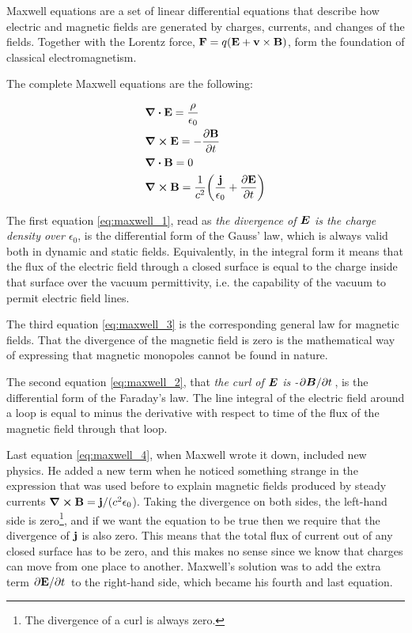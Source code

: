 \documentclass[11pt,a4paper]{article}
\begin{document}
Maxwell equations \cite{feynman} are a set of linear differential equations that describe how electric and magnetic fields are generated by charges, currents, and changes of the fields. Together with the Lorentz force, $\vb{F}=q(\vb{E}+\vb{v}\times\vb{B})$, form the foundation of classical electromagnetism.

The complete Maxwell equations are the following:

\begin{subequations}\label{eq:maxwell_equations}
\begin{align}
&\div\vb{E}=\frac{\rho}{\epsilon_0}\label{eq:maxwell_1}\\
&\curl\vb{E}=-\pdv{\vb{B}}{t}\label{eq:maxwell_2}\\
&\div\vb{B}=0\label{eq:maxwell_3}\\
&\curl\vb{B}=\frac{1}{c^2}\qty(\frac{\vb{j}}{\epsilon_0}+\pdv{\vb{E}}{t})\label{eq:maxwell_4}
\end{align}
\end{subequations}

The first equation \eqref{eq:maxwell_1}, read as \emph{the divergence of $\vb*{E}$ is the charge density over $\epsilon_0$}, is the differential form of the Gauss' law, which is always valid both in dynamic and static fields. Equivalently, in the integral form it means that the flux of the electric field through a closed surface is equal to the charge inside that surface over the vacuum permittivity, i.e. the capability of the vacuum to permit electric field lines.

The third equation \eqref{eq:maxwell_3} is the corresponding general law for magnetic fields. That the divergence of the magnetic field is zero is the mathematical way of expressing that magnetic monopoles cannot be found in nature.

The second equation \eqref{eq:maxwell_2}, that \emph{the curl of $\vb*{E}$ is -$\pdv*{\vb*{B}}{t}$}, is the differential form of the Faraday's law. The line integral of the electric field around a loop is equal to minus the derivative with respect to time of the flux of the magnetic field through that loop.

Last equation \eqref{eq:maxwell_4}, when Maxwell wrote it down, included new physics. He added a new term when he noticed something strange in the expression that was used before to explain magnetic fields produced by steady currents $\curl\vb{B}=\vb{j}/(c^2\epsilon_0$). Taking the divergence on both sides, the left-hand side is zero\footnote{The divergence of a curl is always zero.}, and if we want the equation to be true then we require that the divergence of $\vb{j}$ is also zero. This means that the total flux of current out of any closed surface has to be zero, and this makes no sense since we know that charges can move from one place to another. Maxwell's solution was to add the extra term $\pdv*{\vb{E}}{t}$ to the right-hand side, which became his fourth and last equation.
\end{document}

